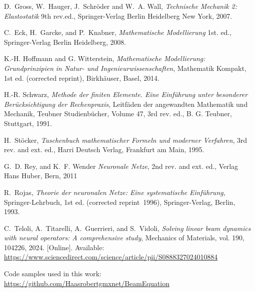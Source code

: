 \documentclass[a4paper,11pt]{article}
\begin{document}
\newpage
\begin{thebibliography}{9}


D.~Gross, W.~Hauger, J.~Schröder and W.~A. Wall,
\emph{Technische Mechanik 2: Elastostatik}
9th rev.ed., Springer-Verlag Berlin Heidelberg New York, 2007.

C.~Eck, H.~Garcke, and P.~Knabner,
\emph{Mathematische Modellierung}
1st. ed., Springer-Verlag Berlin Heidelberg, 2008.

K.-H. Hoffmann and G. Witterstein, 
\emph{Mathematische Modellierung: Grundprinzipien in Natur- und Ingenieurwissenschaften}, 
Mathematik Kompakt, 1st ed. (corrected reprint), Birkhäuser, Basel, 2014.

H.-R. Schwarz,
\emph{Methode der finiten Elemente. Eine Einführung unter besonderer Berücksichtigung der Rechenpraxis},
Leitfäden der angewandten Mathematik und Mechanik, Teubner Studienbücher, Volume 47, 3rd rev. ed., B. G. Teubner, Stuttgart, 1991.

H.~Stöcker, 
\emph{Taschenbuch mathematischer Formeln und moderner Verfahren}, 
3rd rev. and ext. ed., Harri Deutsch Verlag, Frankfurt am Main, 1995.

G.~D. Rey, and K.~F. Wender
\emph{Neuronale Netze}, 
2nd rev. and ext. ed., Verlag Hans Huber, Bern, 2011

R.~Rojas,
\emph{Theorie der neuronalen Netze: Eine systematische Einführung},
Springer-Lehrbuch, 1st ed. (corrected reprint 1996), Springer-Verlag, Berlin, 1993.



C.~Teloli, A.~Titarelli, A.~Guerrieri, and S.~Vidoli, 
\emph{Solving linear beam dynamics with neural operators: A comprehensive study}, 
Mechanics of Materials, vol. 190, 104226, 2024. [Online]. Available: \url{https://www.sciencedirect.com/science/article/pii/S0888327024010884}

Code samples used in this work: \url{https://github.com/Haasrobertgmxnet/BeamEquation}

\end{thebibliography}


\newpage

\end{document}
